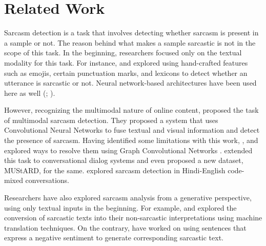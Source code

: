 \section{Related Work}\label{sec:lit}

Sarcasm detection is a task that involves detecting whether sarcasm is present in a sample or not. The reason behind what makes a sample sarcastic is not in the scope of this task. In the beginning, researchers focused only on the textual modality for this task. For instance, \citet{Bouazizi-etal-sarcasm-detection-2016} and \citet{felbo-etal-2017-using} explored using hand-crafted features such as emojis, certain punctuation marks, and lexicons to detect whether an utterance is sarcastic or not. Neural network-based architectures have been used here as well (\citealp{tay-etal-2018-reasoning}; \citealp{babanejad-etal-2020-affective}). 

However, recognizing the multimodal nature of online content, \citet{schifanella-etal-2016} proposed the task of multimodal sarcasm detection. They proposed a system that uses Convolutional Neural Networks \citep{ma-etal-cnn-2015} to fuse textual and visual information and detect the presence of sarcasm. Having identified some limitations with this work, \citet{Qiao_Jing_Song_Chen_Zhu_Nie_2023}, \citet{kumar-etal-2022-become} and \citet{chakrabarty-etal-2020-r} explored ways to resolve them using Graph Convolutional Networks \citep{kipf2017semisupervised}. \citet{castro-etal-2019-towards} extended this task to conversational dialog systems and even proposed a new dataset, MUStARD, for the same. \citet{bedi-etal-code-mixed-2023} explored sarcasm detection in Hindi-English code-mixed conversations.

Researchers have also explored sarcasm analysis from a generative perspective, using only textual inputs in the beginning. For example, \citet{peled-reichart-2017-sarcasm} and \citet{dubey-2019-sarcasm-generation} explored the conversion of sarcastic texts into their non-sarcastic interpretations using machine translation techniques. On the contrary, \citet{mishra-etal-2019-modular} have worked on using sentences that express a negative sentiment to generate corresponding sarcastic text. 

